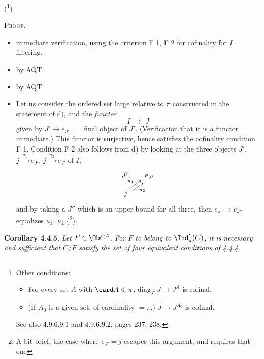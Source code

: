 (\footnote{Other conditions:
\begin{itemize}[leftmargin=3em]
\item[e)] For every set $A$ with $\card A \leqslant \pi$, $\mathrm{diag}_J : J \longrightarrow J^A$ is cofinal.
\item[e$'$)] (If $A_0$ is a given set, of cardinality $= \pi$.) $J \longrightarrow J^{A_0}$ is cofinal.
\end{itemize}
See also 4.9.6.9.1 and 4.9.6.9.2, pages 237, 238.})

\textsc{Proof}.
\begin{itemize}[leftmargin=7em,labelwidth=6em,align=left]
\item[a $\;\Longrightarrow\;$ b] immediate verification, using the criterion F 1, F 2 for cofinality for $I$ filtering.
\item[b $\;\Longrightarrow\;$ c] by AQT.
\item[c $\;\Longrightarrow\;$ d] by AQT.
\end{itemize}

\begin{itemize}[leftmargin=7em,labelwidth=6em,align=left]
\item[d $\;\Longrightarrow\;$ a] Let us consider the ordered set large relative to $\pi$ constructed in the statement of d), and the \textit{functor}
\[
I \;\longrightarrow\; J
\]
given by $J' \longmapsto e_{J'}$ $=$ final object of $J'$. (Verification that it is a functor immediate.) This functor is surjective, hence satisfies the cofinality condition F 1. Condition F 2 also follows from d) by looking at the three objects $J'$, $j \xrightarrow{\;u_1\;} e_{J'}$, $j \xrightarrow{\;u_2\;} e_{J'}$ of $I$,
\[
\begin{tikzcd}[column sep=small, row sep=small]
J', & e_{J'} \\
j \arrow[ur, shift left, "u_1"] \arrow[ur, shift right, "u_2"'] &
\end{tikzcd}
\]
and by taking a $J''$ which is an upper bound for all three, then $e_{J'} \longrightarrow e_{J''}$ equalizes $u_1$, $u_2$ (\footnote{A bit brief, the case where $e_{J'} = j$ escapes this argument, and requires that one}).
\end{itemize}

\textbf{Corollary 4.4.5.} \textit{Let $F \in \Ob C^{\wedge}$. For $F$ to belong to} $\Ind'_\pi(C)$\textit{, it is necessary and sufficient that $C/F$ satisfy the set of four equivalent conditions of 4.4.4.}

